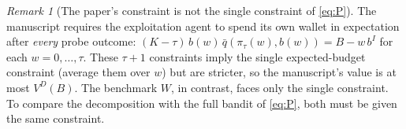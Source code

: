 \documentclass[11pt]{article}
\newcommand{\qbar}{\bar q}
\theoremstyle{remark}
\newtheorem{remark}{Remark}
\begin{document}
\begin{remark}[The paper's constraint is not the single constraint of \eqref{eq:P}]
The manuscript requires the exploitation agent to spend its own wallet in expectation after \emph{every} probe
outcome: $(K-\tau)\,b(w)\,\qbar(\pi_\tau(w),b(w))=B-w\,b^I$ for each $w=0,\dots,\tau$. These $\tau+1$ constraints imply
the single expected-budget constraint (average them over $w$) but are stricter, so the manuscript's value is at most
$V^D(B)$. The benchmark $W$, in contrast, faces only the single constraint. To compare the decomposition with the
full bandit of \eqref{eq:P}, both must be given the same constraint.
\end{remark}
\end{document}
